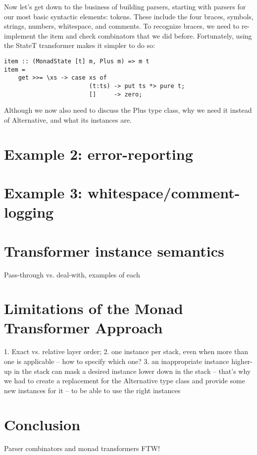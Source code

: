 \documentclass{tmr}
\begin{document}
Now let's get down to the business of building parsers, starting with parsers
for our most basic syntactic elements:  tokens.
These include the four braces, symbols, strings, numbers, whitespace, and comments.
To recognize braces, we need to re-implement the item and check combinators that
we did before.  Fortunately, using the StateT transformer makes it simpler
to do so:
\begin{verbatim}
item :: (MonadState [t] m, Plus m) => m t
item =
    get >>= \xs -> case xs of
                        (t:ts) -> put ts *> pure t;
                        []     -> zero;
\end{verbatim}
Although we now also need to discuss the Plus type class, why we need it instead of
Alternative, and what its instances are.


\section{Example 2: error-reporting}

\section{Example 3: whitespace/comment-logging}




\section{Transformer instance semantics}

Pass-through vs. deal-with, examples of each


\section{Limitations of the Monad Transformer Approach}

1. Exact vs. relative layer order; 
2. one instance per stack, even when more than one is applicable --
how to specify which one?
3. an inappropriate instance higher-up in the stack can mask a 
desired instance lower down in the stack -- that's why we had to
create a replacement for the Alternative type class and provide
some new instances for it -- to be able to use the right instances



\section{Conclusion}

Parser combinators and monad transformers FTW!



\end{document}
